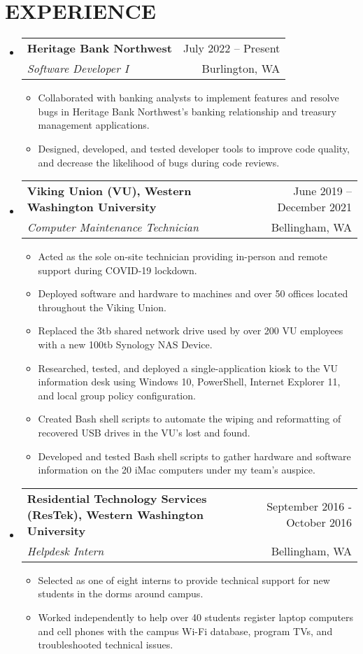\documentclass[letterpaper,11pt]{article}
\makeatletter
\newcommand{\resumeItem}[1]{
  \item\small{
    {#1 \vspace{-1pt}}
  }
}
\newcommand{\resumeSubheading}[4]{
  \vspace{-1pt}\item
    \begin{tabular*}{\textwidth}[t]{l@{\extracolsep{\fill}}r}
      \textbf{#1} & {\color{dark-grey}\small #2}\vspace{1pt}\\ %
      \textit{#3} & {\color{dark-grey} \small #4}\\ %
    \end{tabular*}\vspace{-4pt}
}
\newcommand{\resumeSubHeadingListStart}{\begin{itemize}[leftmargin=0in, label={}]}
\newcommand{\resumeSubHeadingListEnd}{\end{itemize}}
\newcommand{\resumeItemListStart}{\begin{itemize}}
\newcommand{\resumeItemListEnd}{\end{itemize}\vspace{0pt}}
\makeatother
\begin{document}
\section{EXPERIENCE}
  \resumeSubHeadingListStart

    \resumeSubheading
      {Heritage Bank Northwest}{July 2022 -- Present}
      {Software Developer I}{Burlington, WA}
     \resumeItemListStart
        \resumeItem{Collaborated with banking analysts to implement features and resolve bugs in Heritage Bank Northwest's banking relationship and treasury management applications.}
        \resumeItem{Designed, developed, and tested developer tools to improve code quality, and decrease the likelihood of bugs during code reviews.}
     \resumeItemListEnd 

    \resumeSubheading
      {Viking Union (VU), Western Washington University}{June 2019 -- December 2021}
      {Computer Maintenance Technician}{Bellingham, WA}
      \resumeItemListStart
        \resumeItem{Acted as the sole on-site technician providing in-person and remote support during COVID-19 lockdown.}
        \resumeItem{Deployed software and hardware to machines and over 50 offices located throughout the Viking Union.}
        \resumeItem{Replaced the 3tb shared network drive used by over 200 VU employees with a new 100tb Synology NAS Device.}
        \resumeItem{Researched, tested, and deployed a single-application kiosk to the VU information desk using Windows 10, PowerShell, Internet Explorer 11, and local group policy configuration.}
        \resumeItem{Created Bash shell scripts to automate the wiping and reformatting of recovered USB drives in the VU’s lost and found.}
        \resumeItem{Developed and tested Bash shell scripts to gather hardware and software information on the 20 iMac computers under my team's auspice.}
      \resumeItemListEnd

    \resumeSubheading
      {Residential Technology Services (ResTek), Western Washington University}{September 2016 - October 2016}
      {Helpdesk Intern}{Bellingham, WA}
      \resumeItemListStart
        \resumeItem{Selected as one of eight interns to provide technical support for new students in the dorms around campus. }
        \resumeItem{Worked independently to help over 40 students register laptop computers and cell phones with the campus Wi-Fi database, program TVs, and troubleshooted technical issues.}
      \resumeItemListEnd
  \resumeSubHeadingListEnd


\end{document}

